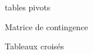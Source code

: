 \begin{frame}{tables pivots}
\end{frame}

\begin{frame}{Matrice de contingence}
  
\end{frame}

\begin{frame}{Tableaux croisés}
  
\end{frame}
